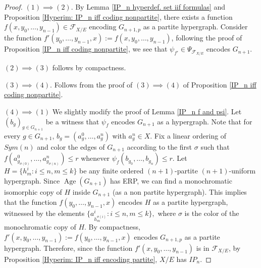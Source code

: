 \documentclass{amsart}
\newtheorem{external claim}[teor]{Claim}
\newcommand{\II}{\mathbf{I}}
\DeclareMathOperator{\age}{{Age}}
\begin{document}
\begin{proof}
    $(1)\implies (2)$. By Lemma \ref{IP_n hyperdef. set iif formulas} and Proposition \ref{Hyperim: IP_n iff coding nonpartite}, there exists a function $f(x,y_0,\dots,y_{n-1})\in\mathcal{F}_{X/E}$ encoding $G_{n+1,p}$ as a partite hypergraph. Consider the function $f'(y_0,\dots,y_{n-1},x):=f(x,y_0,\dots,y_{n-1})$, following the proof of Proposition \ref{IP_n iff coding nonpartite}, we see that $\psi_{f'}\in \Psi_{\mathcal{F}_{X/E}}$ encodes $G_{n+1}$. 
    
    $(2)\implies (3)$ follows by compactness.
    
    $(3) \implies (4)$. Follows from the proof of $(3)\implies (4)$ of Proposition \ref{IP_n iff coding nonpartite}.%
    

    $(4)\implies (1)$ We slightly modify the proof of Lemma \ref{IP_n f and psi}. Let $(b_g)_{g\in G_{n+1}}$ be a witness that $\psi_f$ encodes $G_{n+1}$ as a hypergraph. Note that for every $g\in G_{n+1}$, $b_g=(a^0_g,\dots, a^n_g)$ with $a^n_g\in X$. Fix a linear ordering of $Sym(n)$ and color the edges of $G_{n+1}$ according to the first $\sigma$ such that $f(a^0_{g_{\sigma(0)}},\dots,a^n_{g_{\sigma(n)}})\leq r$ whenever $\psi_f(b_{g_0},\dots,b_{g_n})\leq r$. Let $H=\{ h^i_m: i\leq n, m\leq k \}$ be any finite ordered $(n+1)$-partite $(n+1)$-uniform hypergraph. Since $\age(G_{n+1})$ has ERP, we can find a monochromatic isomorphic copy of $H$ inside $G_{n+1}$ (as a non partite hypergraph). This implies that the function $f(y_0,\dots,y_{n-1},x)$ encodes $H$ as a partite hypergraph, witnessed by the elements $\{ a^i_{h^{\sigma(i)}_m}: i\leq n, m\leq k \},$ where $\sigma$ is the color of the monochromatic copy of $H$. By compactness, $f'(x,y_0,\dots,y_{n-1}):=f(y_0,\dots,y_{n-1},x)$ encodes $G_{n+1,p}$ as a partite hypergraph. Therefore, since the function $f'(x,y_0,\dots,y_{n-1})$ is in $\mathcal{F}_{X/E}$, by Proposition \ref{Hyperim: IP_n iff encoding partite}, $X/E$ has $IP_n$.
\end{proof}
\end{document}
